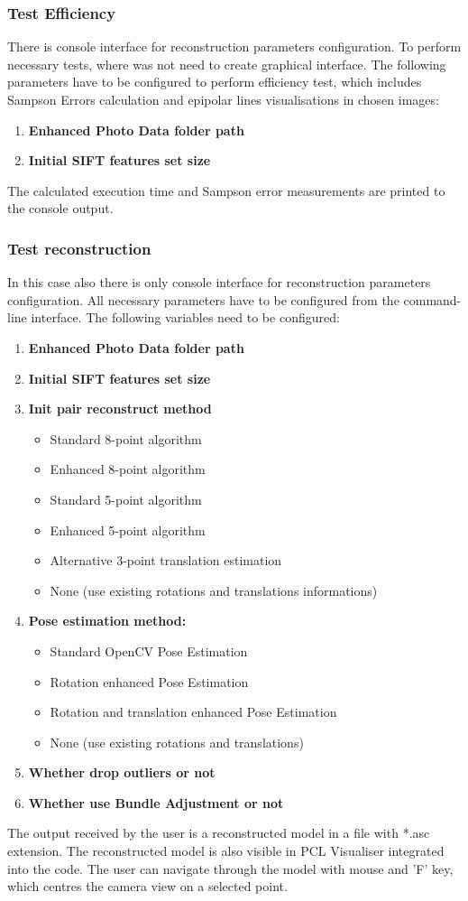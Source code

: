 \subsubsection{Test Efficiency}
There is console interface for reconstruction parameters configuration. To perform necessary tests, where was not need to create graphical interface. The following parameters have to be configured to perform efficiency test, which includes Sampson Errors calculation and epipolar lines visualisations in chosen images:
\begin{enumerate}
\item \textbf{Enhanced Photo Data folder path}
\item \textbf{Initial SIFT features set size}
\end{enumerate}
The calculated execution time and Sampson error measurements are printed to the console output.
\subsubsection{Test reconstruction}
In this case also there is only console interface for reconstruction parameters configuration. All necessary parameters have to be configured from the command-line interface. The following variables need to be configured:
\begin{enumerate}
\item \textbf{Enhanced Photo Data folder path}
\item \textbf{Initial SIFT features set size}
\item \textbf{Init pair reconstruct method}
\begin{itemize}
\item Standard 8-point algorithm
\item Enhanced 8-point algorithm
\item Standard 5-point algorithm
\item Enhanced 5-point algorithm
\item Alternative 3-point translation estimation
\item None (use existing rotations and translations informations)
\end{itemize}
\item \textbf{Pose estimation method:}
\begin{itemize}
\item Standard OpenCV Pose Estimation
\item Rotation enhanced Pose Estimation 
\item Rotation and translation enhanced Pose Estimation
\item None (use existing rotations and translations)
\end{itemize}
\item \textbf{Whether drop outliers or not}
\item \textbf{Whether use Bundle Adjustment or not}
\end{enumerate}
The output received by the user is a reconstructed model in a file with *.asc extension. The reconstructed model is also visible in PCL Visualiser integrated into the code. The user can navigate through the model with mouse and 'F' key, which centres the camera view on a selected point.
